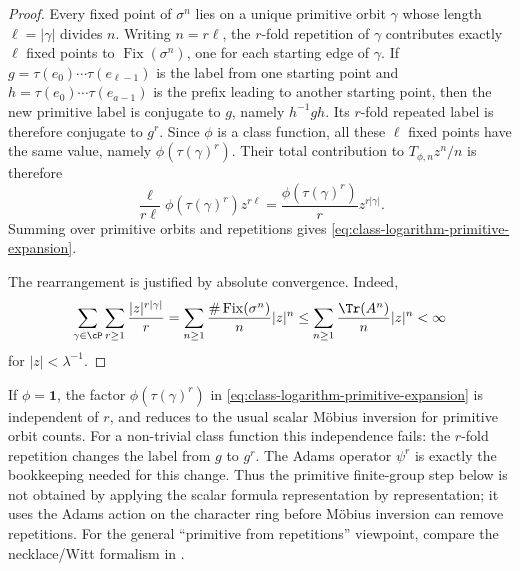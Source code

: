 \begin{proof}
  Every fixed point of \(\sigma^n\) lies on a unique primitive orbit
  \(\gamma\) whose length \(\ell=|\gamma|\) divides \(n\). Writing
  \(n=r\ell\), the \(r\)-fold repetition of \(\gamma\) contributes
  exactly \(\ell\) fixed points to \(\operatorname{Fix}(\sigma^n)\), one
  for each starting edge of \(\gamma\). If
  \(g=\tau(e_0)\cdots\tau(e_{\ell-1})\) is the label from one starting
  point and \(h=\tau(e_0)\cdots\tau(e_{a-1})\) is the prefix leading to
  another starting point, then the new primitive label is conjugate to
  \(g\), namely \(h^{-1}gh\). Its \(r\)-fold repeated label is therefore
  conjugate to \(g^r\). Since \(\phi\) is a class function, all these
  \(\ell\) fixed points have the same value, namely
  \(\phi(\tau(\gamma)^r)\). Their total contribution to
  \(T_{\phi,n}z^n/n\) is therefore
  \[
    \frac{\ell}{r\ell}\phi(\tau(\gamma)^r)z^{r\ell}
    =
    \frac{\phi(\tau(\gamma)^r)}{r}z^{r|\gamma|}.
  \]
  Summing over primitive orbits and repetitions gives
  \eqref{eq:class-logarithm-primitive-expansion}.

  The rearrangement is justified by absolute convergence. Indeed,
  \[
    \sum_{\gamma\in\cP}\sum_{r\ge 1}
      \frac{|z|^{r|\gamma|}}{r}
    =
    \sum_{n\ge 1}\frac{\#\operatorname{Fix}(\sigma^n)}{n}|z|^n
    \le
    \sum_{n\ge 1}\frac{\Tr(A^n)}{n}|z|^n
    <\infty
  \]
  for \(|z|<\lambda^{-1}\).
\end{proof}

\begin{remark}
  \label{rem:ordinary-mobius-stops}
  If \(\phi=\mathbf 1\), the factor
  \(\phi(\tau(\gamma)^r)\) in
  \eqref{eq:class-logarithm-primitive-expansion} is independent of
  \(r\), and  reduces to the
  usual scalar M\"obius inversion for primitive orbit counts. For a
  non-trivial class function this independence fails: the \(r\)-fold
  repetition changes the label from \(g\) to \(g^r\). The Adams operator
  \(\psi^r\) is exactly the bookkeeping needed for this change. Thus the
  primitive finite-group step below is not obtained by applying the
  scalar formula representation by representation; it uses the Adams
  action on the character ring before M\"obius inversion can remove
  repetitions. For the general ``primitive from repetitions'' viewpoint,
  compare the necklace/Witt formalism in
  \cite{MetropolisRota1983Necklaces,Wehrhahn1990AperiodicRings}.
\end{remark}

